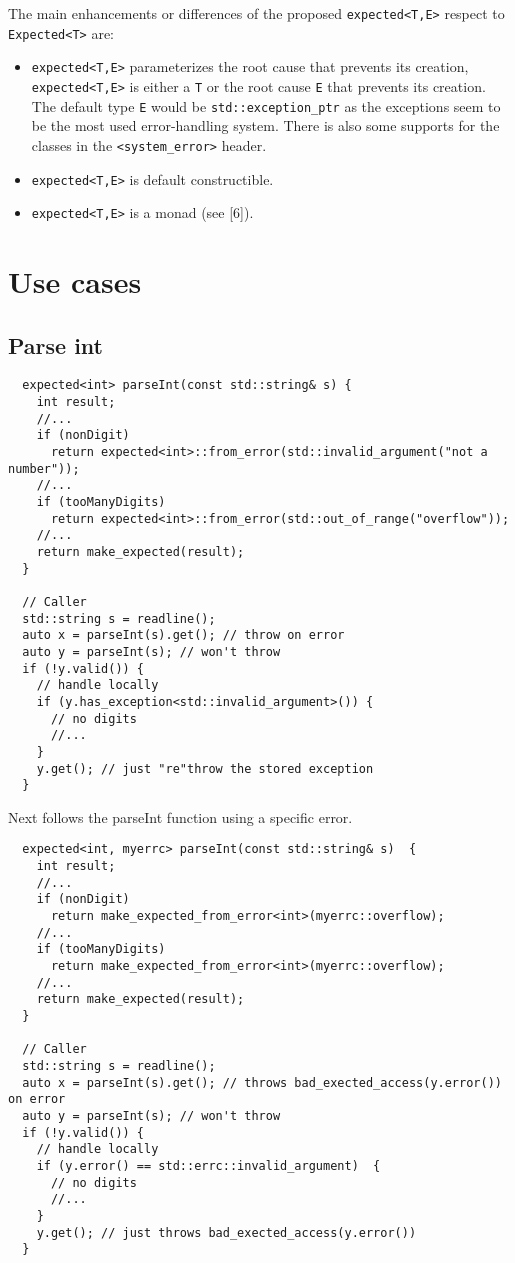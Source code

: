 \documentclass[a4paper,10pt]{article}
\newcommand{\cpp}[1]{\lstinline{#1}}
\begin{document}
\noindent
The main enhancements or differences of the proposed \cpp{expected<T,E>} respect to \cpp{Expected<T>} are:
\begin{itemize}
 \item \cpp{expected<T,E>} parameterizes the root cause that prevents its creation, \cpp{expected<T,E>} is either a \cpp{T} or the root cause \cpp{E} that prevents its creation. The default type \cpp{E} would be \cpp{std::exception_ptr} as the exceptions seem to be the most used error-handling system. There is also some supports for the classes in the \cpp{<system_error>} header.
 \item \cpp{expected<T,E>} is default constructible.
 \item \cpp{expected<T,E>} is a monad (see [6]).
\end{itemize}


\section{Use cases}

\subsection{Parse int}

\begin{lstlisting}
  expected<int> parseInt(const std::string& s) {
    int result;
    //...
    if (nonDigit)  
      return expected<int>::from_error(std::invalid_argument("not a number"));
    //...
    if (tooManyDigits) 
      return expected<int>::from_error(std::out_of_range("overflow"));
    //...
    return make_expected(result);
  }

  // Caller
  std::string s = readline();
  auto x = parseInt(s).get(); // throw on error
  auto y = parseInt(s); // won't throw
  if (!y.valid()) {
    // handle locally
    if (y.has_exception<std::invalid_argument>()) {
      // no digits
      //...
    }
    y.get(); // just "re"throw the stored exception
  }
\end{lstlisting}

Next follows the parseInt function using a specific error.

\begin{lstlisting}
  expected<int, myerrc> parseInt(const std::string& s)  {
    int result;
    //...
    if (nonDigit)  
      return make_expected_from_error<int>(myerrc::overflow);
    //...
    if (tooManyDigits)  
      return make_expected_from_error<int>(myerrc::overflow);
    //...
    return make_expected(result);
  }

  // Caller
  std::string s = readline();
  auto x = parseInt(s).get(); // throws bad_exected_access(y.error()) on error
  auto y = parseInt(s); // won't throw
  if (!y.valid()) {
    // handle locally
    if (y.error() == std::errc::invalid_argument)  {
      // no digits
      //...
    }
    y.get(); // just throws bad_exected_access(y.error())
  }
\end{lstlisting}
\end{document}
